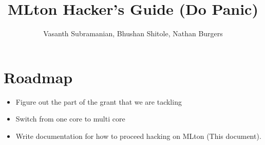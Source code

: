 \documentclass{article}
\title{MLton Hacker's Guide (Do Panic)}
\author{Vasanth Subramanian, Bhushan Shitole, Nathan Burgers}
\date{}
\begin{document}
\maketitle
\tableofcontents
\clearpage

\section{Roadmap}
\begin{itemize}
\item Figure out the part of the grant that we are tackling
\item Switch from one core to multi core
\item Write documentation for how to proceed hacking on MLton (This document).
\end{itemize}
\end{document}

